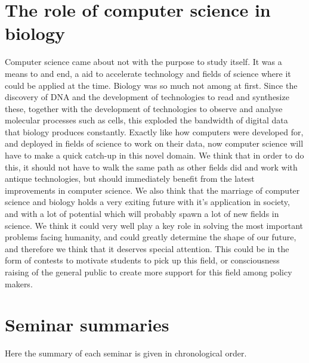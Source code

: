 \documentclass[a4paper]{article}
\begin{document}
\section{The role of computer science in biology}
Computer science came about not with the purpose to study itself. It was a means to and end, a aid to accelerate technology and fields of science where it could be applied at the time. Biology was so much not among at first. Since the discovery of DNA and the development of technologies to read and synthesize these, together with the development of technologies to observe and analyse molecular processes such as cells, this exploded the bandwidth of digital data that biology produces constantly. Exactly like how computers were developed for, and deployed in fields of science to work on their data, now computer science will have to make a quick catch-up in this novel domain. We think that in order to do this, it should not have to walk the same path as other fields did and work with antique technologies, but should immediately benefit from the latest improvements in computer science. We also think that the marriage of computer science and biology holds a very exiting future with it's application in society, and with a lot of potential which will probably spawn a lot of new fields in science. We think it could very well play a key role in solving the most important problems facing humanity, and could greatly determine the shape of our future, and therefore we think that it deserves special attention. This could be in the form of contests to motivate students to pick up this field, or consciousness raising of the general public to create more support for this field among policy makers.

\section{Seminar summaries}
Here the summary of each seminar is given in chronological order.





\end{document}
